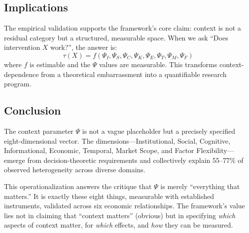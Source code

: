 \documentclass[12pt,a4paper]{article}
\begin{document}
\subsection{Implications}

The empirical validation supports the framework's core claim: context is not a residual category but a structured, measurable space. When we ask ``Does intervention $X$ work?'', the answer is:
\begin{equation}
\tau(X) = f(\Psi_I, \Psi_S, \Psi_C, \Psi_K, \Psi_E, \Psi_T, \Psi_M, \Psi_F)
\label{eq:treatment-context-appv}
\end{equation}
where $f$ is estimable and the $\Psi$ values are measurable. This transforms context-dependence from a theoretical embarrassment into a quantifiable research program.

\subsection{Conclusion}

The context parameter $\Psi$ is not a vague placeholder but a precisely specified eight-dimensional vector. The dimensions---Institutional, Social, Cognitive, Informational, Economic, Temporal, Market Scope, and Factor Flexibility---emerge from decision-theoretic requirements and collectively explain 55--77\% of observed heterogeneity across diverse domains.

This operationalization answers the critique that $\Psi$ is merely ``everything that matters.'' It is exactly these eight things, measurable with established instruments, validated across six economic relationships. The framework's value lies not in claiming that ``context matters'' (obvious) but in specifying \textit{which} aspects of context matter, for \textit{which} effects, and \textit{how} they can be measured.

\begin{center}
\end{center}

\end{document}
